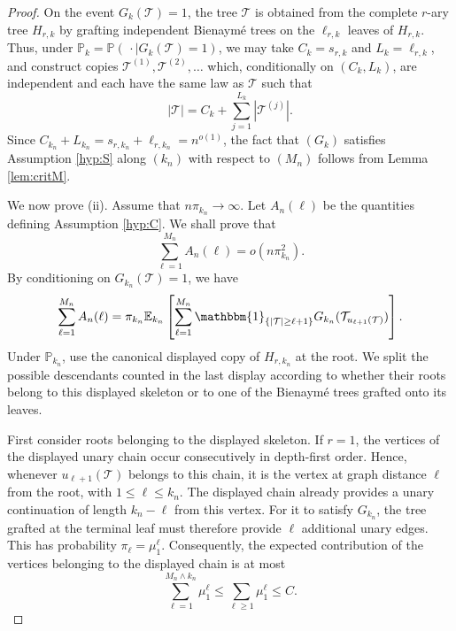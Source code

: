 \documentclass[a4paper,11pt]{article}
\newcommand{\E}{\mathbb{E}}
\DeclareRobustCommand{\P}{\mathbb{P}}
\DeclareRobustCommand{\1}{\mathbf{1}}
\begin{document}
\begin{proof}
  On the event $G_k(\mathcal T)=1$, the tree $\mathcal T$ is obtained from
  the complete $r$-ary tree $H_{r,k}$ by grafting independent Bienaym\'e
  trees on the $\ell_{r,k}$ leaves of $H_{r,k}$. Thus, under
  $\P_k=\P(\,\cdot\mid G_k(\mathcal T)=1)$, we may take
  $C_k=s_{r,k}$ and $L_k=\ell_{r,k}$, and construct copies $\mathcal T^{(1)},\mathcal T^{(2)},\ldots$ which,
conditionally on $(C_k,L_k)$, are independent and each have the same law
as $\mathcal T$ such that
  $$
    |\mathcal T|
    =
    C_k+\sum_{j=1}^{L_k}|\mathcal T^{(j)}|.
  $$
  Since $C_{k_n}+L_{k_n}=s_{r,k_n}+\ell_{r,k_n}=n^{o(1)}$, the fact that  $(G_k)$ satisfies Assumption \ref{hyp:S} along $(k_{n})$ with respect to $(M_n)$ follows from Lemma \ref{lem:critM}.

We now prove \textup{(ii)}. Assume that $n\pi_{k_n}\to\infty$. Let
$A_n(\ell)$ be the quantities defining Assumption \ref{hyp:C}. We shall
prove that
$$
\sum_{\ell=1}^{M_n}A_n(\ell)=o(n\pi_{k_n}^2).
$$
  By conditioning on $G_{k_n}(\mathcal T)=1$, we have
  $$
    \sum_{\ell=1}^{M_{n}}A_n(\ell)
    =
    \pi_{k_n}
   \E_{k_n}\left[
      \sum_{\ell=1}^{M_{n}}
      \mathbbm{1}_{\{|\mathcal T|\ge \ell+1\}}
      G_{k_n}(\mathcal T_{u_{\ell+1}(\mathcal T)})
    \right].
  $$
  Under $\P_{k_n}$, use the canonical displayed copy of $H_{r,k_n}$
  at the root. We split the possible descendants counted in the last display
  according to whether their roots belong to this displayed skeleton or to one
  of the Bienaym\'e trees grafted onto its leaves.

First consider roots belonging to the displayed skeleton. If $r=1$, the
vertices of the displayed unary chain occur consecutively in depth-first
order. Hence, whenever $u_{\ell+1}(\mathcal T)$ belongs to this chain, it is
the vertex at graph distance $\ell$ from the root, with
$1\le \ell\le k_n$. The displayed chain already provides a unary
continuation of length $k_n-\ell$ from this vertex. For it to satisfy
$G_{k_n}$, the tree grafted at the terminal leaf must therefore provide
$\ell$ additional unary edges. This has probability
$\pi_\ell=\mu_1^\ell$. Consequently, the expected contribution of the
vertices belonging to the displayed chain is at most
$$
\sum_{\ell=1}^{M_n\wedge k_n}\mu_1^\ell
\le
\sum_{\ell\ge1}\mu_1^\ell
\le C.
$$


\end{proof}
\end{document}
